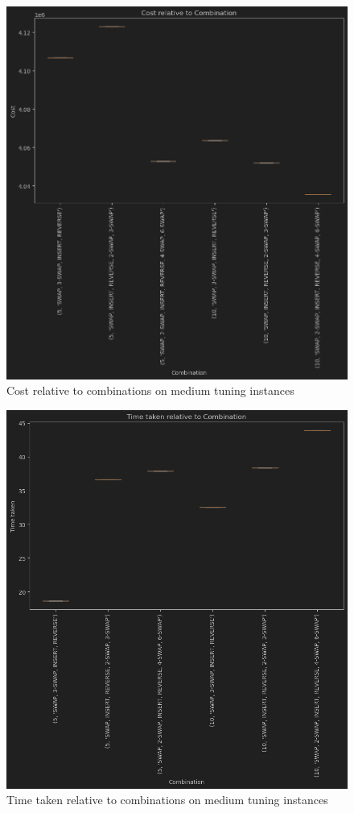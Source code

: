 \documentclass{article}
\begin{document}
\begin{figure}[H]
	\includegraphics[width=\linewidth]{cost_combination_gvns_med.png}
	\caption{Cost relative to combinations on medium tuning instances}
\end{figure}

\begin{figure}[H]
	\includegraphics[width=\linewidth]{time_comb_gvns_med.png}
	\caption{Time taken relative to combinations on medium tuning instances}
\end{figure}
\end{document}
